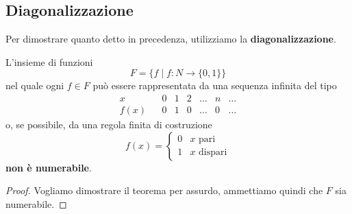\subsection{Diagonalizzazione}
Per dimostrare quanto detto in precedenza, utilizziamo la \textbf{diagonalizzazione}.
\begin{theorem}
	L'insieme di funzioni
	\[ F = \{ f \mid f : N \rightarrow \{0, 1\} \} \]
	nel quale ogni $f \in F$ pu\`o essere rappresentata da una sequenza infinita del tipo
	\[
		\begin{matrix}
			x    &  & 0 & 1 & 2 & \dots & n & \dots \\
			f(x) &  & 0 & 1 & 0 & \dots & 0 & \dots
		\end{matrix}
	\]
	o, se possibile, da una regola finita di costruzione
	\[
		f(x) = \begin{cases}
			0 & x \text{ pari}    \\
			1 & x \text{ dispari}
		\end{cases}
	\]
	\textbf{non \`e numerabile}.
	\begin{proof}
		Vogliamo dimostrare il teorema per assurdo, ammettiamo quindi che $F$ sia numerabile.


\end{proof}
\end{theorem}
